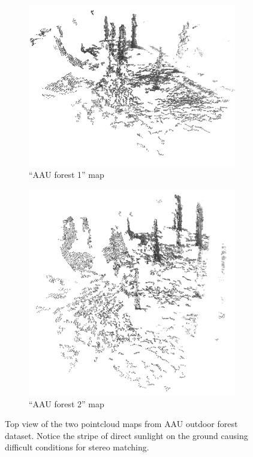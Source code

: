 
\begin{figure}
    \centering
    \begin{subfigure}[b]{0.82\textwidth}
        \includegraphics[width=\textwidth]{../img/aau_fc_dnav5_top.png}
        \caption{``\gls{AAU} forest 1'' map}
    \end{subfigure}
    \begin{subfigure}[b]{0.82\textwidth}
        \includegraphics[width=\textwidth]{../img/aau_fc_dnav6_top.png}
        \caption{``\gls{AAU} forest 2'' map}
    \end{subfigure}
    \caption[Forest pointcloud maps -- top view]{Top view of the two pointcloud maps from \gls{AAU} outdoor forest dataset. Notice the stripe of direct sunlight on the ground causing difficult conditions for stereo matching.}
    \label{fig:aau_top}
\end{figure}

